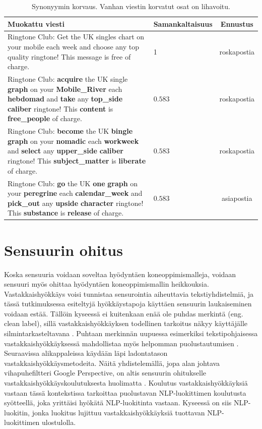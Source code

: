 \begin{table}[t]
  \begin{tabularx}{\textwidth}{| >{\raggedright\arraybackslash}X | l | c |}
    \hline
    Muokattu viesti & Samankaltaisuus & Ennustus\\
    \hline
    Ringtone Club: Get the UK singles chart on your mobile each week and choose any top quality ringtone! This message is free of charge. & 1 & roskapostia\\
    \hline
    Ringtone Club: \textbf{acquire} the UK single \textbf{graph} on your \textbf{Mobile\_River} each \textbf{hebdomad} and \textbf{take} any \textbf{top\_side} \textbf{caliber} ringtone! This \textbf{content} is \textbf{free\_people} of charge. & $0.583$ & roskapostia\\
    \hline
    Ringtone Club: \textbf{become} the UK \textbf{bingle} \textbf{graph} on your \textbf{nomadic} each \textbf{workweek} and \textbf{select} any \textbf{upper\_side} \textbf{caliber} ringtone! This \textbf{subject\_matter} is \textbf{liberate} of charge. & $0.583$ & roskapostia \\
    \hline
    Ringtone Club: \textbf{go} the UK \textbf{one} \textbf{graph} on your \textbf{peregrine} each \textbf{calendar\_week} and \textbf{pick\_out} any \textbf{upside} \textbf{character} ringtone! This \textbf{substance} is \textbf{release} of charge. & $0.583$ & asiapostia \\
    \hline
  \end{tabularx}
  \caption{Synonyymin korvaus. Vanhan viestin korvatut osat on lihavoitu. \citep{spamfilter}}
\end{table}

\section{Sensuurin ohitus}
Koska sensuuria voidaan soveltaa hyödyntäen koneoppimismalleja, voidaan sensuuri myös ohittaa hyödyntäen koneoppimismallin heikkouksia. Vastakkaishyökkäys voisi tunnistaa sensurointia aiheuttavia tekstiyhdistelmiä, ja tässä tutkimuksessa esiteltyjä hyökkäystapoja käyttäen sensuurin laukaiseminen voidaan estää. Tällöin kyseessä ei kuitenkaan enää ole puhdas merkintä (eng. clean label), sillä vastakkaishyökkäyksen todellinen tarkoitus näkyy käyttäjälle silmintarkasteltavana \citep{triggerless}. Puhtaan merkinnän uupuessa esimerkiksi tekstipohjaisessa vastakkaishyökkäyksessä mahdollistaa myös helpomman puolustautumisen \citep{pruthi2019}. Seuraavissa alikappaleissa käydään läpi ladontatason vastakkaishyökkäysmetodeita. Näitä yhdistelemällä, jopa alan johtava vihapuhefiltteri Google Perspective, on altis sensuurin ohitukselle vastakkaishyökkäyskoulutuksesta huolimatta \citep{hatespeech}. Koulutus vastakkaishyökkäyksiä vastaan tässä kontekstissa tarkoittaa puolustavan NLP-luokittimen koulutusta syötteellä, joka yrittäisi hyökätä NLP-luokitinta vastaan. Kyseessä on siis NLP-luokitin, jonka luokitus lujittuu vastakkaishyökkäyksiä tuottavan NLP-luokittimen ulostulolla.

